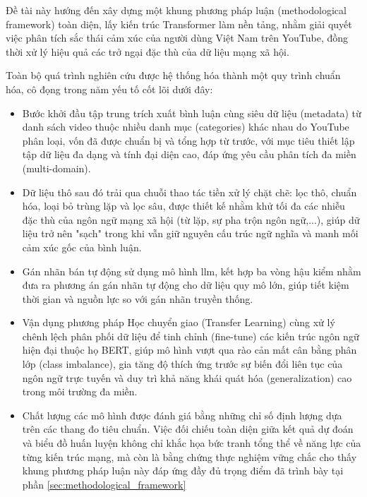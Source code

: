 Đề tài này hướng đến xây dựng một khung phương pháp luận (methodological framework) toàn diện, lấy kiến trúc Transformer làm nền tảng, nhằm giải quyết việc phân tích sắc thái cảm xúc của người dùng Việt Nam trên YouTube, đồng thời xử lý hiệu quả các trở ngại đặc thù của dữ liệu mạng xã hội.

Toàn bộ quá trình nghiên cứu được hệ thống hóa thành một quy trình chuẩn hóa, cô đọng trong năm yếu tố cốt lõi dưới đây:

\begin{itemize}[label=-]
    \item Bước khởi đầu tập trung trích xuất bình luận cùng siêu dữ liệu (metadata) từ danh sách video thuộc nhiều danh mục (categories) khác nhau do YouTube phân loại, vốn đã được chuẩn bị và tổng hợp từ trước, với mục tiêu thiết lập tập dữ liệu đa dạng và tính đại diện cao, đáp ứng yêu cầu phân tích đa miền (multi-domain).
    \item Dữ liệu thô sau đó trải qua chuỗi thao tác tiền xử lý chặt chẽ: lọc thô, chuẩn hóa, loại bỏ trùng lặp và lọc sâu, được thiết kế nhằm khử tối đa các nhiễu đặc thù của ngôn ngữ mạng xã hội (từ lặp, sự pha trộn ngôn ngữ,...), giúp dữ liệu trở nên "sạch" trong khi vẫn giữ nguyên cấu trúc ngữ nghĩa và manh mối cảm xúc gốc của bình luận.
    \item Gán nhãn bán tự động sử dụng mô hình \gls{llm}, kết hợp ba vòng hậu kiểm nhằm đưa ra phương án gán nhãn tự động cho dữ liệu quy mô lớn, giúp tiết kiệm thời gian và nguồn lực so với gán nhãn truyền thống.
    \item Vận dụng phương pháp Học chuyển giao (Transfer Learning) cùng xử lý chênh lệch phân phối dữ liệu để tinh chỉnh (fine-tune) các kiến trúc ngôn ngữ hiện đại thuộc họ BERT, giúp mô hình vượt qua rào cản mất cân bằng phân lớp (class imbalance), gia tăng độ thích ứng trước sự biến đổi liên tục của ngôn ngữ trực tuyến và duy trì khả năng khái quát hóa (generalization) cao trong môi trường đa miền.
    \item Chất lượng các mô hình được đánh giá bằng những chỉ số định lượng dựa trên các thang đo tiêu chuẩn. Việc đối chiếu toàn diện giữa kết quả dự đoán và biểu đồ huấn luyện không chỉ khắc họa bức tranh tổng thể về năng lực của từng kiến trúc mạng, mà còn là bằng chứng thực nghiệm vững chắc cho thấy khung phương pháp luận này đáp ứng đầy đủ trọng điểm đã trình bày tại phần \ref{sec:methodological_framework}
\end{itemize}
